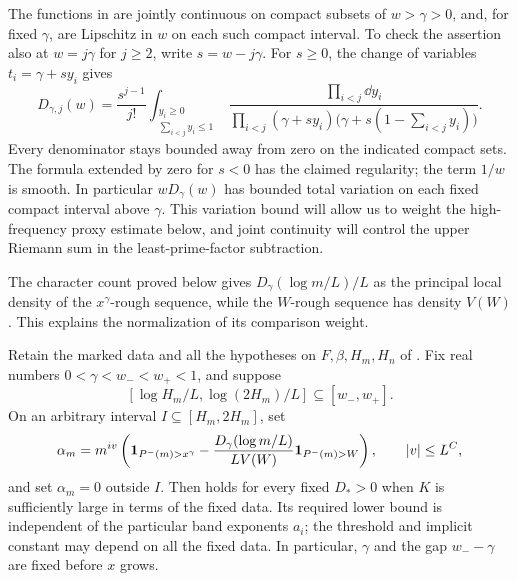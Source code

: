 The functions in  are jointly
continuous on compact subsets of \(w>\gamma>0\), and, for fixed
\(\gamma\), are Lipschitz in \(w\) on each such compact interval.  To
check the assertion also at \(w=j\gamma\) for \(j\ge2\), write
\(s=w-j\gamma\).  For \(s\ge0\), the change of variables
\(t_i=\gamma+s y_i\) gives
\[
 D_{\gamma,j}(w)=\frac{s^{j-1}}{j!}
 \int_{\substack{y_i\ge0\\\sum_{i<j}y_i\le1}}
 \frac{\prod_{i<j}\dd y_i}
 {\prod_{i<j}(\gamma+s y_i)
  \bigl(\gamma+s(1-\sum_{i<j}y_i)\bigr)}.
\]
Every denominator stays bounded away from zero on the indicated compact
sets.  The formula extended by zero for \(s<0\) has the claimed
regularity; the term \(1/w\) is smooth.  In particular \(wD_\gamma(w)\)
has bounded total variation on each fixed compact interval above
\(\gamma\).  This variation bound will allow us to weight the
high-frequency proxy estimate below, and joint continuity will control
the upper Riemann sum in the least-prime-factor subtraction.

The character count proved below gives
\(D_\gamma(\log m/L)/L\) as the principal local density of the
\(x^\gamma\)-rough sequence, while the \(W\)-rough sequence has density
\(V(W)\).  This explains the normalization of its comparison weight.
\begin{proposition}\label{prop:rough-type-ii}
Retain the marked data and all the hypotheses on \(F,\beta,H_m,H_n\) of
.  Fix real numbers
\(0<\gamma<w_-<w_+<1\), and suppose
\[
 [\log H_m/L,\log(2H_m)/L]\subseteq[w_-,w_+].
\]
On an arbitrary interval \(I\subseteq[H_m,2H_m]\), set
\begin{equation}\label{eq:rough-type-ii-coefficient}
 \alpha_m=m^{iv}\left(
    \mathbf{1}_{P^-(m)>x^\gamma}
    -\frac{D_\gamma(\log m/L)}{L V(W)}\mathbf{1}_{P^-(m)>W}
                         \right),\qquad |v|\le L^C,
\end{equation}
and set \(\alpha_m=0\) outside \(I\).  Then
 holds for every fixed \(D_*>0\) when \(K\) is
sufficiently large in terms of the fixed data.  Its required lower bound
is independent of the particular band exponents \(a_i\); the threshold
and implicit constant may depend on all the fixed data.  In particular,
\(\gamma\) and the gap \(w_--\gamma\) are fixed before \(x\) grows.
\end{proposition}

